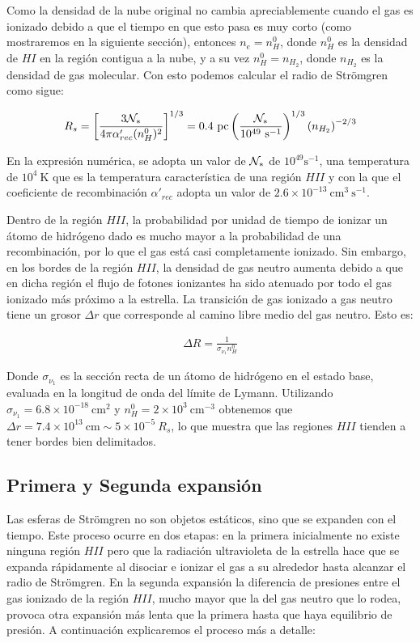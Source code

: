 Como la densidad de la nube original no cambia apreciablemente cuando el gas es ionizado debido a que el tiempo en que esto pasa es muy corto (como mostraremos en la siguiente sección), entonces $n_e = n^0_H$, donde $n^0_H$ es la densidad de $HI$ en la región contigua a la nube, y a su vez $n^0_H = n_{H_2}$, donde $n_{H_2}$ es la densidad de gas molecular. Con esto podemos calcular el radio de Strömgren como sigue:

\begin{align}
  R_s = \left[\frac{3\mathcal{N}_*}{4\pi\alpha'_{rec}(n^0_H)^2}\right]^{1/3} = 0.4\mathrm{~pc}\left(\frac{\mathcal{N}_*}{10^{49}\mathrm{~s^{-1}}}\right)^{1/3}\left(n_{H_2}\right)^{-2/3}
\end{align}

En la expresión numérica, se adopta un valor de $\mathcal{N}_*$ de $10^{49}\mathrm{s^{-1}}$, una temperatura de $10^4\mathrm{~K}$ que es la temperatura característica de una región $HII$ y con la que el coeficiente de recombinación $\alpha'_{rec}$ adopta un valor de $2.6\times 10^{-13}\mathrm{~cm^3~s^{-1}}$.

Dentro de la región $HII$, la probabilidad por unidad de tiempo de ionizar un átomo de hidrógeno dado es mucho mayor a la probabilidad de una recombinación, por lo que el gas está casi completamente ionizado. Sin embargo, en los bordes de la región $HII$, la densidad de gas neutro aumenta debido a que en dicha región el flujo de fotones ionizantes ha sido atenuado por todo el gas ionizado más próximo a la estrella. La transición de gas ionizado a gas neutro tiene un grosor $\Delta r$ que corresponde al camino libre medio del gas neutro. Esto es:

\begin{align}
\Delta R = \frac{1}{\sigma_{\nu_1}n^0_H}  
\end{align}

Donde $\sigma_{\nu_1}$ es la sección recta de un átomo de hidrógeno en el estado base, evaluada en la longitud de onda del límite de Lymann. Utilizando $\sigma_{\nu_1} = 6.8\times 10^{-18}\mathrm{~cm^2}$ y $n^0_H = 2\times 10^{3}\mathrm{~cm^{-3}}$ obtenemos que $\Delta r = 7.4\times 10^{13}\mathrm{~cm} \sim 5\times 10^{-5}~R_s$, lo que muestra que las regiones $HII$ tienden a tener bordes bien delimitados.

\subsection{Primera y Segunda expansión}

Las esferas de Strömgren no son objetos estáticos, sino que se expanden con el tiempo. Este proceso ocurre en dos etapas: en la primera inicialmente no existe ninguna región $HII$ pero que la radiación ultravioleta de la estrella hace que se expanda rápidamente al disociar e ionizar el gas a su alrededor hasta alcanzar el radio de Strömgren. En la segunda expansión la diferencia de presiones entre el gas ionizado de la región $HII$, mucho mayor que la del gas neutro que lo rodea, provoca otra expansión más lenta que la primera hasta que haya equilibrio de presión. A continuación explicaremos el proceso más a detalle:

